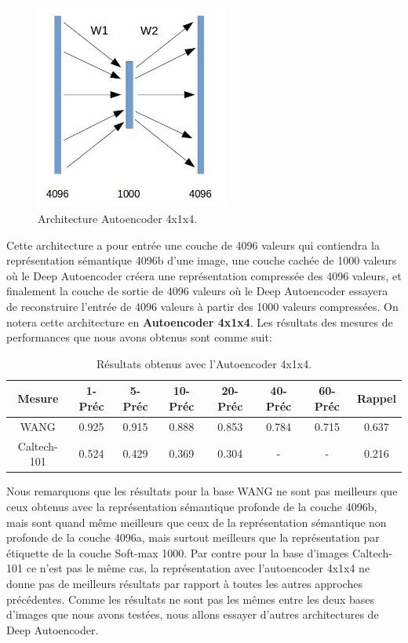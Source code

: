 \begin{figure}[H]
	\centering
		\includegraphics[width=2.5in]{Figures/ae/414.jpg}
	\caption[An Electron]{Architecture Autoencoder 4x1x4.}
	\label{fig:Electron}
\end{figure}

	Cette architecture a pour entrée une couche de 4096 valeurs qui contiendra la représentation sémantique 4096b d'une image, une couche cachée de 1000 valeurs où le Deep Autoencoder créera une représentation compressée des 4096 valeurs, et finalement la couche de sortie de 4096 valeurs où le Deep Autoencoder essayera de reconstruire l'entrée de 4096 valeurs à partir des 1000 valeurs compressées. On notera cette architecture en \textbf{Autoencoder 4x1x4}. Les résultats des mesures de performances que nous avons obtenus sont comme suit:
	

\begin{table}[H]
\begin{center}
\begin{tabular}{|c|c|c|c|c|c|c|c|}
\hline
	Mesure & 1-Préc & 5-Préc & 10-Préc & 20-Préc & 40-Préc & 60-Préc & Rappel\\
\hline
	WANG & 0.925 & 0.915 & 0.888 & 0.853 & 0.784 & 0.715 & 0.637\\
\hline
	Caltech-101 & 0.524 & 0.429 & 0.369 & 0.304 & - & - & 0.216\\
\hline
\end{tabular}
\end{center}
\caption{Résultats obtenus avec l'Autoencoder 4x1x4.}
\end{table}

	Nous remarquons que les résultats pour la base WANG ne sont pas meilleurs que ceux obtenus avec la représentation sémantique profonde de la couche 4096b, mais sont quand même meilleurs que ceux de la représentation sémantique non profonde de la couche 4096a, mais surtout meilleurs que la représentation par étiquette de la couche Soft-max 1000.
	Par contre pour la base d'images Caltech-101 ce n'est pas le même cas, la représentation avec l'autoencoder 4x1x4 ne donne pas de meilleurs résultats par rapport à toutes les autres approches précédentes.
	Comme les résultats ne sont pas les mêmes entre les deux bases d'images que nous avons testées, nous allons essayer d'autres architectures de Deep Autoencoder.


